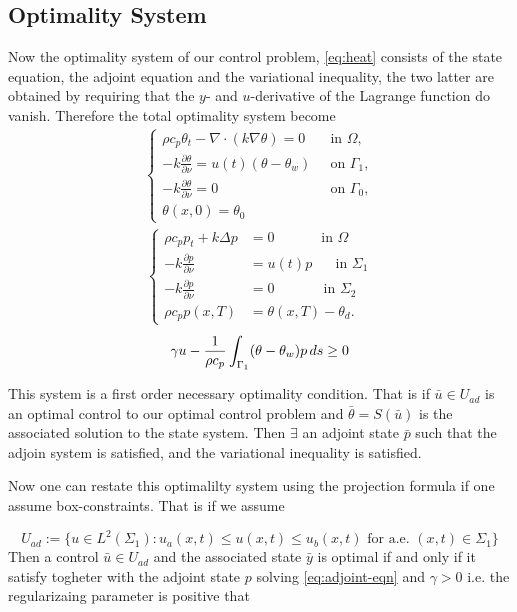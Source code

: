 \subsection{Optimality System}
Now the optimality system of our control problem, \eqref{eq:heat} consists of the state equation, the adjoint equation and the variational inequality, the two latter are obtained by requiring that the $y$- and $u$-derivative of the Lagrange function do vanish. Therefore the total optimality system become
%
\begin{align*}
    \begin{cases}
     \rho c_p \theta_t - \nabla \cdot (k \nabla \theta) = 0 \quad & \text{in $\Omega$}, \\
      -k \frac{\partial \theta}{\partial \nu} = u(t) (\theta - \theta_w) &\text{on } \Gamma_1, \\
      -k \frac{\partial \theta}{\partial \nu} = 0  &\text{on } \Gamma_0, \\
      \theta(x, 0) = \theta_0 
      \end{cases}
      \end{align*}
      \begin{align*}
      \begin{cases}
       \rho c_p p_t + k\Delta p &= 0 \quad\qquad\textrm{ in } \Omega \\
      -k\frac{\partial p}{\partial\nu} &= u(t)p \,\,\quad\textrm{ in } \Sigma_1 \\
      -k\frac{\partial p}{\partial\nu} &= 0 \,\quad\qquad\textrm{ in } \Sigma_2 \\
      \rho c_p p(x, T) &= \theta(x, T) - \theta_d.
      \end{cases}
      \end{align*}
\begin{equation*}
      \gamma u - \frac{1}{\rho c_p} \int_{\Gamma_1} (\theta - \theta_w)p \mathop{ds} \geq 0
\end{equation*}

This system is a first order necessary optimality condition. That is if $\bar{u} \in U_{ad}$ is an optimal control to our optimal control problem and $\bar{\theta} = S(\bar{u})$ is the associated solution to the state system. Then $\exists$ an adjoint state $\bar{p}$ such that the adjoin system is satisfied, and the variational inequality is satisfied. 

Now one can restate this optimalilty system using the projection formula if one assume box-constraints. That is if we assume

\begin{equation}
    \label{eq:box_constraints}
    U_{ad} := \{ u \in L^2(\Sigma_1): u_a(x,t) \leq u(x,t) \leq u_b(x,t) \text{ for a.e. } (x,t) \in \Sigma_1 \}
\end{equation}
Then a control $\bar{u} \in U_{ad}$ and the associated state $\bar{y}$ is optimal if and only if it satisfy togheter with the adjoint state $p$ solving \eqref{eq:adjoint-eqn}  and $\gamma >0$ i.e. the regularizaing parameter is positive that
